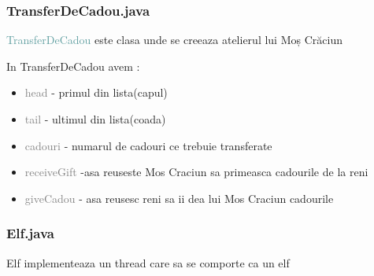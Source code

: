 \documentclass{article}
\begin{document}
\subsubsection{\textcolor{Periwinkle}{TransferDeCadou.java}}
\textcolor{CadetBlue}{TransferDeCadou} este clasa unde se creeaza atelierul lui Moș Crăciun

In TransferDeCadou avem :
\begin{itemize}
\item  \textcolor{Gray}{head} - primul din lista(capul)
\item \textcolor{Gray}{tail} - ultimul din lista(coada)
\item \textcolor{Gray}{cadouri} - numarul de cadouri ce trebuie transferate
\item \textcolor{Gray}{receiveGift} -asa reuseste Mos Craciun sa primeasca cadourile de la reni
\item \textcolor{Gray}{giveCadou} - asa reusesc reni sa ii dea lui Mos Craciun cadourile
\end{itemize}

\subsubsection{\textcolor{Periwinkle}{Elf.java}}
\textcolor{YellowOrange}{Elf} implementeaza un thread care sa se comporte ca un elf
\end{document}
